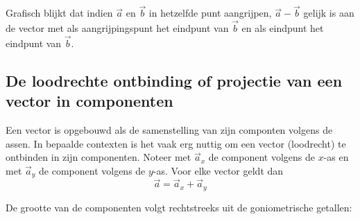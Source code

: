 \documentclass{ximera}
\begin{document}
\begin{image}[0.5\textwidth]
\end{image}

Grafisch blijkt dat indien \(\vec{a}\) en \(\vec{b}\) in hetzelfde punt aangrijpen, \(\vec{a} - \vec{b}\) gelijk is aan de vector met als aangrijpingspunt het eindpunt van \(\vec{b}\) en als eindpunt het eindpunt van \(\vec{b}\).



\subsection*{De loodrechte ontbinding of projectie van een vector in componenten}



Een vector is opgebouwd als de samenstelling van zijn componten volgens de assen.  
In bepaalde contexten is het vaak erg nuttig om een vector (loodrecht) te ontbinden in zijn componenten. 
Noteer met \(\vec{a}_x\) de component volgens de \(x\)-as en met \(\vec{a}_y\) de component volgens de \(y\)-as. 
Voor elke vector geldt dan 
\[
\vec{a} = \vec{a}_x + \vec{a}_y
\]

De grootte van de componenten volgt rechtstreeks uit de goniometrische getallen: 
\end{document}
